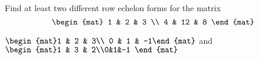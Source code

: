 
\begin{Exercise}[
name={},
title={}, 
difficulty=0,
origin={\cite{SZ}}]
Find at least two different row echelon forms for the matrix
\[
\begin{mat}
1 & 2 & 3 \\ 
4 & 12 & 8 
\end{mat}
\]
\end{Exercise}

\begin{Answer}
$\begin{mat}1 & 2 & 3\\ 0 & 1 & -1\end{mat}$ and $\begin{mat}1 & 3 & 2\\0&1&-1 \end{mat}$
\end{Answer}
